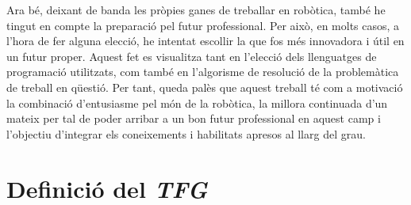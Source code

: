 \documentclass[12pt,a4paper,final,twoside]{report}
\begin{document}
Ara bé, deixant de banda les pròpies ganes de treballar en robòtica, també he tingut en compte la preparació pel futur professional. Per això, en molts casos, a l'hora de fer alguna elecció, he intentat escollir la que fos més innovadora i útil en un futur proper. Aquest fet es visualitza tant en l'elecció dels llenguatges de programació utilitzats, com també en l'algorisme de resolució de la problemàtica de treball en qüestió. Per tant, queda palès que aquest treball té com a motivació la combinació d'entusiasme pel món de la robòtica, la millora continuada d'un mateix per tal de poder arribar a un bon futur professional en aquest camp i l'objectiu d'integrar els coneixements i habilitats apresos al llarg del grau.


\section*{Definició del \textit{TFG}}
\label{Definicio-del-TFG}


\end{document}
